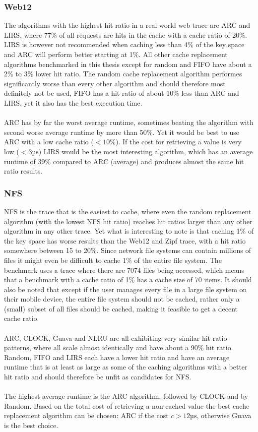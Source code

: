 \documentclass[pdftex,a4paper,12pt,twoside]{report}
\begin{document}
\subsubsection{Web12}
The algorithms with the highest hit ratio in a real world web trace are ARC and LIRS, where 77\% of all requests are hits in the cache with a cache ratio of 20\%. LIRS is however not recommended when caching less than 4\% of the key space and ARC will perform better starting at 1\%. All other cache replacement algorithms benchmarked in this thesis except for random and FIFO have about a 2\% to 3\% lower hit ratio. The random cache replacement algorithm performes significantly worse than every other algorithm and should therefore most definitely not be used, FIFO has a hit ratio of about 10\% less than ARC and LIRS, yet it also has the best execution time.
\\\\
ARC has by far the worst average runtime, sometimes beating the algorithm with second worse average runtime by more than 50\%. Yet it would be best to use ARC with a low cache ratio ($<10\%$). If the cost for retrieving a value is very low ($<3\text{µs}$) LIRS would be the most interesting algorithm, which has an average runtime of 39\% compared to ARC (average) and produces almost the same hit ratio results.
\subsubsection{NFS}
NFS is the trace that is the easiest to cache, where even the random replacement algorithm (with the lowest NFS hit ratio) reaches hit ratios larger than any other algorithm in any other trace. Yet what is interesting to note is that caching 1\% of the key space has worse results than the Web12 and Zipf trace, with a hit ratio somewhere between 15 to 20\%. Since network file systems can contain millions of files it might even be difficult to cache 1\% of the entire file system. The benchmark uses a trace where there are 7074 files being accessed, which means that a benchmark with a cache ratio of 1\% has a cache size of 70 items. It should also be noted that except if the user manages every file in a large file system on their mobile device, the entire file system should not be cached, rather only a (small) subset of all files should be cached, making it feasible to get a decent cache ratio.
\\\\
ARC, CLOCK, Guava and NLRU are all exhibiting very similar hit ratio patterns, where all scale almost identically and have about a 90\% hit ratio. Random, FIFO and LIRS each have a lower hit ratio and have an average runtime that is at least as large as some of the caching algorithms with a better hit ratio and should therefore be unfit as candidates for NFS.
\\\\
The highest average runtime is the ARC algorithm, followed by CLOCK and by Random. Based on the total cost of retrieving a non-cached value the best cache replacement algorithm can be chosen: ARC if the cost $c > 12\text{µs}$, otherwise Guava is the best choice.
\end{document}
